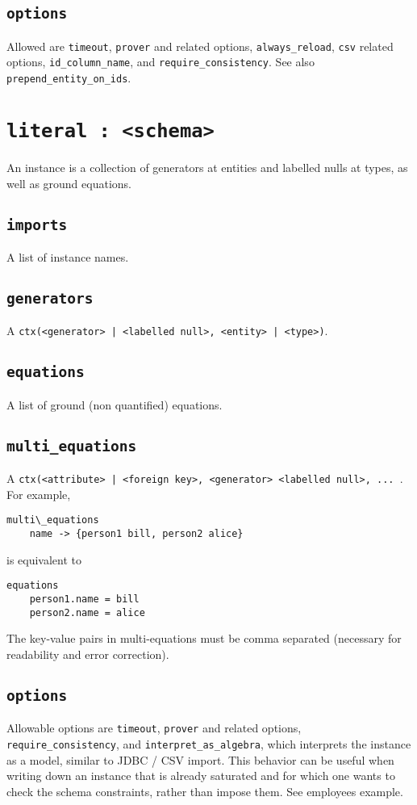 \documentclass[10pt]{book}
\begin{document}
\subsection{{\tt options}}
Allowed are {\tt timeout}, {\tt prover} and related options, {\tt always\_reload}, {\tt csv} related options, {\tt id\_column\_name}, and {\tt require\_consistency}. 
 See also {\tt prepend\_entity\_on\_ids}.

\section{{\tt literal : <schema>}}

An instance is a collection of generators at entities and labelled nulls at types, as well as ground equations.

\subsection{{\tt imports}}
A list of instance names.

\subsection{{\tt generators}}
A {\tt ctx(<generator> | <labelled null>, <entity> | <type>)}.

\subsection{{\tt equations}}
A list of ground (non quantified) equations.

\subsection{{\tt multi\_equations}}
A {\tt ctx(<attribute> | <foreign key>, {<generator> <labelled null>, ... }}.  For example,
\begin{verbatim}
multi\_equations
	name -> {person1 bill, person2 alice}
\end{verbatim}
is equivalent to
\begin{verbatim}
equations
	person1.name = bill
	person2.name = alice
\end{verbatim}
The key-value pairs in multi-equations must be comma separated (necessary for readability and error correction).

\subsection{{\tt options}}
Allowable options are {\tt timeout}, {\tt prover} and related options, {\tt require\_consistency}, and {\tt interpret\_as\_algebra}, which interprets the instance as a model, similar to JDBC / CSV import.  This behavior can be useful when writing down an instance that is already saturated and for which one wants to check the schema constraints, rather than impose them. See employees example.
\end{document}
